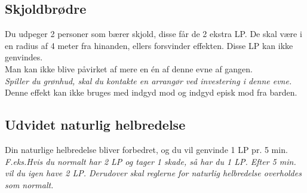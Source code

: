 



\subsection*{Skjoldbrødre}
Du udpeger 2 personer som bærer skjold, disse får de 2 ekstra LP. De skal være i en radius af 4 meter fra hinanden, ellers forsvinder effekten. Disse LP kan ikke genvindes.\\
Man kan ikke blive påvirket af mere en én af denne evne af gangen.\\
\emph{Spiller du grønhud, skal du kontakte en arrangør ved investering i denne evne.}\\
Denne effekt kan ikke bruges med indgyd mod og indgyd episk mod fra barden.\\



\subsection*{Udvidet naturlig helbredelse}
Din naturlige helbredelse bliver forbedret, og du vil genvinde 1 LP pr. 5
min.\\ 
\textit{F.eks.\newline Hvis du normalt har 2 LP og tager 1 skade, så har du 1 LP. Efter 5 min. vil du igen have 2 LP. Derudover skal reglerne for naturlig helbredelse overholdes som normalt.}